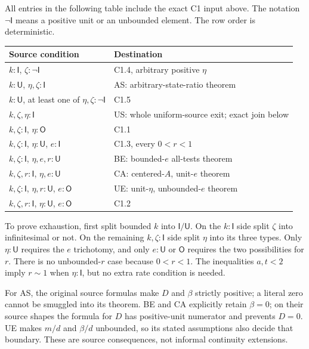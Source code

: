 \documentclass[11pt]{article}
\newcommand{\I}{\mathsf I}
\newcommand{\U}{\mathsf U}
\newcommand{\Otype}{\mathsf O}
\begin{document}
All entries in the following table include the exact C1 input above.
The notation $\neg\I$ means a positive unit or an unbounded element.
The row order is deterministic.
\begin{longtable}{p{.57\linewidth}p{.35\linewidth}}
\toprule Source condition & Destination \\\midrule
$k:\I$, $\zeta:\neg\I$ & C1.4, arbitrary positive $\eta$ \\
$k:\U$, $\eta,\zeta:\I$ & AS: arbitrary-state-ratio theorem \\
$k:\U$, at least one of $\eta,\zeta:\neg\I$ & C1.5 \\
$k,\zeta,\eta:\I$ & US: whole uniform-source exit; exact join below \\
$k,\zeta:\I$, $\eta:\Otype$ & C1.1 \\
$k,\zeta:\I$, $\eta:\U$, $e:\I$ & C1.3, every $0<r<1$ \\
$k,\zeta:\I$, $\eta,e,r:\U$ & BE: bounded-$e$ all-tests theorem \\
$k,\zeta,r:\I$, $\eta,e:\U$ & CA: centered-$A$, unit-$e$ theorem \\
$k,\zeta:\I$, $\eta,r:\U$, $e:\Otype$ & UE: unit-$\eta$, unbounded-$e$ theorem \\
$k,\zeta,r:\I$, $\eta:\U$, $e:\Otype$ & C1.2 \\
\bottomrule
\end{longtable}
To prove exhaustion, first split bounded $k$ into $\I/\U$. On the
$k:\I$ side split $\zeta$ into infinitesimal or not. On the remaining
$k,\zeta:\I$ side split $\eta$ into its three types. Only
$\eta:\U$ requires the $e$ trichotomy, and only $e:\U$ or
$\Otype$ requires the two possibilities for $r$. There is no
unbounded-$r$ case because $0<r<1$. The inequalities $a,t<2$ imply
$r\sim1$ when $\eta:\I$, but no extra rate condition is needed.

For AS, the original source formulas make $D$ and $\beta$ strictly
positive; a literal zero cannot be smuggled into its theorem. BE and CA
explicitly retain $\beta=0$; on their source shapes the formula for
$D$ has positive-unit numerator and prevents $D=0$. UE makes
$m/d$ and $\beta/d$ unbounded, so its stated assumptions also decide
that boundary. These are source consequences, not informal continuity
extensions.
\end{document}
